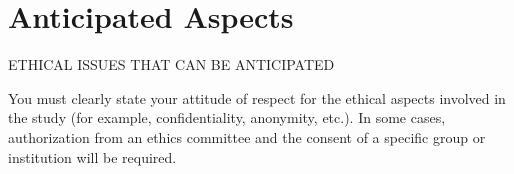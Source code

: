 \section{Anticipated Aspects}
ETHICAL ISSUES THAT CAN BE ANTICIPATED

You must clearly state your attitude of respect for the ethical aspects involved in the study (for example, confidentiality, anonymity, etc.). In some cases, authorization from an ethics committee and the consent of a specific group or institution will be required.

